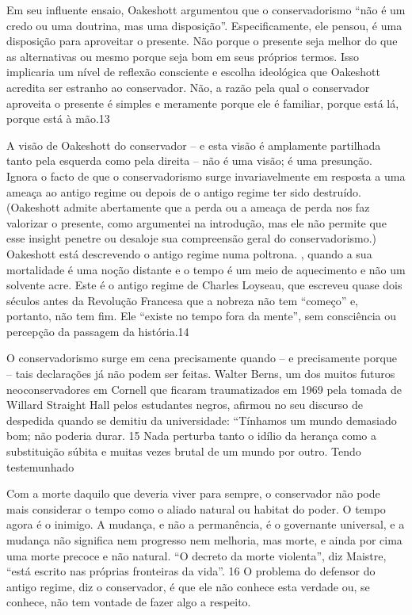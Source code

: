  \par 
Em seu influente ensaio, Oakeshott argumentou que o conservadorismo “não é um credo ou uma doutrina, mas uma disposição”. Especificamente, ele pensou, é uma disposição para aproveitar o presente. Não porque o presente seja melhor do que as alternativas ou mesmo porque seja bom em seus próprios termos. Isso implicaria um nível de reflexão consciente e escolha ideológica que Oakeshott acredita ser estranho ao conservador. Não, a razão pela qual o conservador aproveita o presente é simples e meramente porque ele é familiar, porque está lá, porque está à mão.{\color{blue}13}
 \par 
A visão de Oakeshott do conservador – e esta visão é amplamente partilhada tanto pela esquerda como pela direita – não é uma visão; é uma presunção. Ignora o facto de que o conservadorismo surge invariavelmente em resposta a uma ameaça ao antigo regime ou depois de o antigo regime ter sido destruído. (Oakeshott admite abertamente que a perda ou a ameaça de perda nos faz valorizar o presente, como argumentei na introdução, mas ele não permite que esse insight penetre ou desaloje sua compreensão geral do conservadorismo.) Oakeshott está descrevendo o antigo regime numa poltrona. , quando a sua mortalidade é uma noção distante e o tempo é um meio de aquecimento e não um solvente acre. Este é o antigo regime de Charles Loyseau, que escreveu quase dois séculos antes da Revolução Francesa que a nobreza não tem “começo” e, portanto, não tem fim. Ele “existe no tempo fora da mente”, sem consciência ou percepção da passagem da história.{\color{blue}14}
 \par 
O conservadorismo surge em cena precisamente quando – e precisamente porque – tais declarações já não podem ser feitas. Walter Berns, um dos muitos futuros neoconservadores em Cornell que ficaram traumatizados em 1969 pela tomada de Willard Straight Hall pelos estudantes negros, afirmou no seu discurso de despedida quando se demitiu da universidade: “Tínhamos um mundo demasiado bom; não poderia durar. {\color{blue}15} Nada perturba tanto o idílio da herança como a substituição súbita e muitas vezes brutal de um mundo por outro. Tendo testemunhado
 \par 
Com a morte daquilo que deveria viver para sempre, o conservador não pode mais considerar o tempo como o aliado natural ou habitat do poder. O tempo agora é o inimigo. A mudança, e não a permanência, é o governante universal, e a mudança não significa nem progresso nem melhoria, mas morte, e ainda por cima uma morte precoce e não natural. “O decreto da morte violenta”, diz Maistre, “está escrito nas próprias fronteiras da vida”. {\color{blue}16} O problema do defensor do antigo regime, diz o conservador, é que ele não conhece esta verdade ou, se conhece, não tem vontade de fazer algo a respeito.
